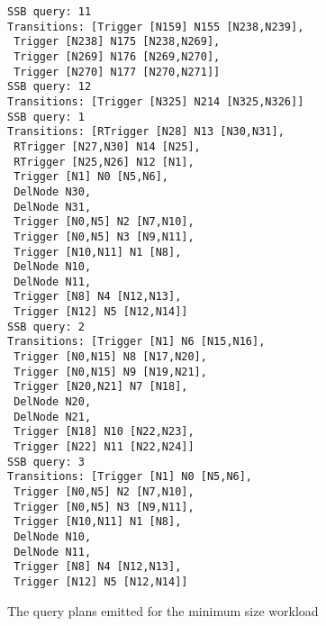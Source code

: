 \begin{code}
\begin{verbatim}
SSB query: 11
Transitions: [Trigger [N159] N155 [N238,N239],
 Trigger [N238] N175 [N238,N269],
 Trigger [N269] N176 [N269,N270],
 Trigger [N270] N177 [N270,N271]]
SSB query: 12
Transitions: [Trigger [N325] N214 [N325,N326]]
SSB query: 1
Transitions: [RTrigger [N28] N13 [N30,N31],
 RTrigger [N27,N30] N14 [N25],
 RTrigger [N25,N26] N12 [N1],
 Trigger [N1] N0 [N5,N6],
 DelNode N30,
 DelNode N31,
 Trigger [N0,N5] N2 [N7,N10],
 Trigger [N0,N5] N3 [N9,N11],
 Trigger [N10,N11] N1 [N8],
 DelNode N10,
 DelNode N11,
 Trigger [N8] N4 [N12,N13],
 Trigger [N12] N5 [N12,N14]]
SSB query: 2
Transitions: [Trigger [N1] N6 [N15,N16],
 Trigger [N0,N15] N8 [N17,N20],
 Trigger [N0,N15] N9 [N19,N21],
 Trigger [N20,N21] N7 [N18],
 DelNode N20,
 DelNode N21,
 Trigger [N18] N10 [N22,N23],
 Trigger [N22] N11 [N22,N24]]
SSB query: 3
Transitions: [Trigger [N1] N0 [N5,N6],
 Trigger [N0,N5] N2 [N7,N10],
 Trigger [N0,N5] N3 [N9,N11],
 Trigger [N10,N11] N1 [N8],
 DelNode N10,
 DelNode N11,
 Trigger [N8] N4 [N12,N13],
 Trigger [N12] N5 [N12,N14]]
\end{verbatim}
\label{fig:workload_plans}
\caption{The query plans emitted for the minimum size workload}
\end{code}

